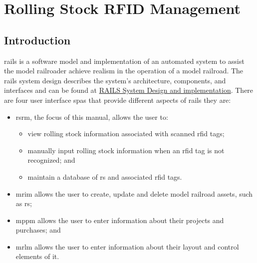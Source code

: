 \chapter{Rolling Stock RFID Management}
\section{Introduction}
\gls{rails} is a software model and implementation of an automated system to assist the model railroader achieve realism in the operation of a model railroad.
The \gls{rails} system design describes the system's architecture, components, and interfaces and can be found at \href{https://github.com/djbristow/RAILS/blob/master/Documentation/rails-system.pdf}{RAILS System Design and implementation}.
There are four user interface \glspl{spa} that provide different aspects of \gls{rails} they are:
\begin{itemize}
  \item \gls{rsrm}, the focus of this manual, allows the user to:
	\begin{itemize}
		\item view rolling stock information associated with scanned \gls{rfid} tags;
		\item manually input rolling stock information when an \gls{rfid} tag is not recognized; and
		\item maintain a database of \gls{rs} and associated \gls{rfid} tags.
	\end{itemize}
  \item \gls{mrim} allows the user to create, update and delete model railroad assets, such as \gls{rs};
  \item \gls{mppm} allows the user to enter information about their projects and purchases; and
  \item \gls{mrlm} allows the user to enter information about their layout and control elements of it.
\end{itemize}
